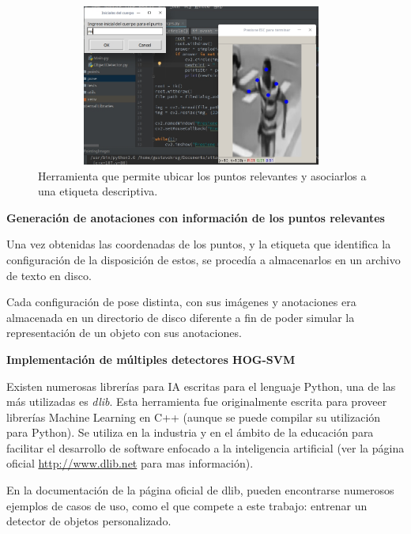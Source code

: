 \documentclass[a4paper,12pt,oneside,spanish]{book}
\begin{document}
\begin{figure}[h!]
	\includegraphics[width=310pt, height=150pt]{Imagenes/pose5.jpg}
	\centering
	\caption{Herramienta que permite ubicar los puntos relevantes y asociarlos a una etiqueta descriptiva.}
	\label{fig:pose5}
\end{figure}


		
\textbf{Generación de anotaciones con información de los puntos relevantes}\par
	
Una vez obtenidas las coordenadas de los puntos, y la etiqueta que identifica la configuración de la disposición de estos, se procedía a almacenarlos en un archivo de texto en disco.\par 

Cada configuración de pose distinta, con sus imágenes y anotaciones era almacenada en un directorio de disco diferente a fin de poder simular la representación de un objeto con sus anotaciones.\par 
	
	
	
\textbf{Implementación de múltiples detectores HOG-SVM }\par

Existen numerosas librerías para IA escritas para el lenguaje Python, una de las más utilizadas es \textit{dlib}. Esta herramienta fue originalmente escrita para proveer librerías Machine Learning en C++ (aunque se puede compilar su utilización para Python). Se utiliza en la industria y en el ámbito de la educación para facilitar el desarrollo de software enfocado a la inteligencia artificial (ver la página oficial \url{http://www.dlib.net} para mas información).\par

En la documentación de la página oficial de dlib, pueden encontrarse numerosos ejemplos de casos de uso, como el que compete a este trabajo: entrenar un detector de objetos personalizado.\par
	
\end{document}
